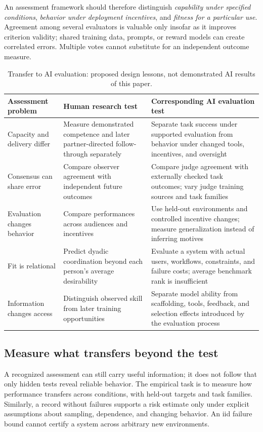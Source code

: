 \documentclass[10pt,twocolumn,letterpaper]{article}
\begin{document}
An assessment framework should therefore distinguish \emph{capability under specified conditions}, \emph{behavior under deployment incentives}, and \emph{fitness for a particular use}. Agreement among several evaluators is valuable only insofar as it improves criterion validity; shared training data, prompts, or reward models can create correlated errors. Multiple votes cannot substitute for an independent outcome measure.

\begin{table}[t]
\caption{Transfer to AI evaluation: proposed design lessons, not demonstrated AI results of this paper.}
\label{tab:ai}
\small\begin{tabularx}{\textwidth}{L{.20\textwidth}Y Y}
\toprule
Assessment problem & Human research test & Corresponding AI evaluation test\\
\midrule
Capacity and delivery differ & Measure demonstrated competence and later partner-directed follow-through separately & Separate task success under supported evaluation from behavior under changed tools, incentives, and oversight\\
Consensus can share error & Compare observer agreement with independent future outcomes & Compare judge agreement with externally checked task outcomes; vary judge training sources and task families\\
Evaluation changes behavior & Compare performances across audiences and incentives & Use held-out environments and controlled incentive changes; measure generalization instead of inferring motives\\
Fit is relational & Predict dyadic coordination beyond each person's average desirability & Evaluate a system with actual users, workflows, constraints, and failure costs; average benchmark rank is insufficient\\
Information changes access & Distinguish observed skill from later training opportunities & Separate model ability from scaffolding, tools, feedback, and selection effects introduced by the evaluation process\\
\bottomrule
\end{tabularx}
\end{table}

\subsection{Measure what transfers beyond the test}
A recognized assessment can still carry useful information; it does not follow that only hidden tests reveal reliable behavior. The empirical task is to measure how performance transfers across conditions, with held-out targets and task families. Similarly, a record without failures supports a risk estimate only under explicit assumptions about sampling, dependence, and changing behavior. An iid failure bound cannot certify a system across arbitrary new environments.
\end{document}

